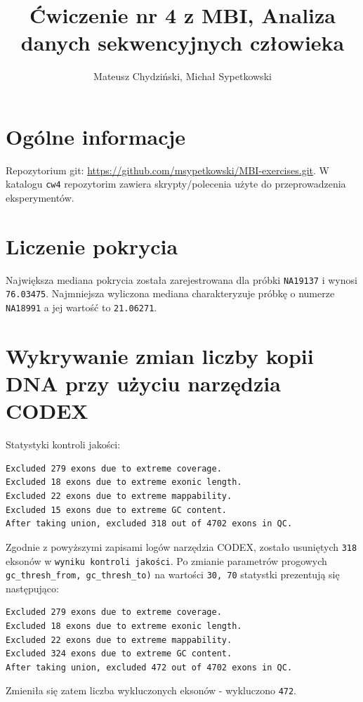 \documentclass[a4paper]{article}
\begin{document}
\title{Ćwiczenie nr 4 z MBI, Analiza danych sekwencyjnych człowieka}
\author{Mateusz Chydziński, Michał Sypetkowski}
\maketitle

\section{Ogólne informacje}
Repozytorium git: \url{https://github.com/msypetkowski/MBI-exercises.git}.
W katalogu \texttt{cw4} repozytorim zawiera skrypty/polecenia użyte do przeprowadzenia eksperymentów.


\section{Liczenie pokrycia}
Największa mediana pokrycia została zarejestrowana dla próbki \texttt{NA19137} i wynosi \texttt{76.03475}. Najmniejsza wyliczona
mediana charakteryzuje próbkę o numerze \texttt{NA18991} a jej wartość to \texttt{21.06271}.


\section{Wykrywanie zmian liczby kopii DNA przy użyciu narzędzia CODEX}
Statystyki kontroli jakości:
\begin{verbatim}
Excluded 279 exons due to extreme coverage.
Excluded 18 exons due to extreme exonic length.
Excluded 22 exons due to extreme mappability.
Excluded 15 exons due to extreme GC content.
After taking union, excluded 318 out of 4702 exons in QC.
\end{verbatim}
Zgodnie z powyższymi zapisami logów narzędzia CODEX, zostało usuniętych \texttt{318} eksonów w \texttt{wyniku kontroli jakości}.
Po zmianie parametrów progowych \texttt{gc\_thresh\_from, gc\_thresh\_to)} na wartości \texttt{30, 70} statystki prezentują się następująco:

\begin{verbatim}
Excluded 279 exons due to extreme coverage.
Excluded 18 exons due to extreme exonic length.
Excluded 22 exons due to extreme mappability.
Excluded 324 exons due to extreme GC content.
After taking union, excluded 472 out of 4702 exons in QC.
\end{verbatim}
Zmieniła się zatem liczba wykluczonych eksonów - wykluczono \texttt{472}.
\end{document}
